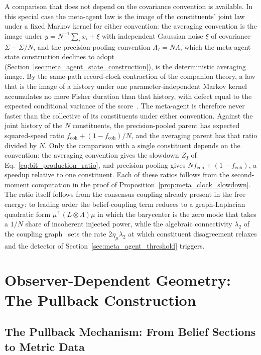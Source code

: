 \documentclass[11pt]{article}
\begin{document}
A comparison that does not depend on the covariance convention is available. In this special case the meta-agent law is the image of the constituents' joint law under a fixed Markov kernel for either convention: the averaging convention is the image under $y = N^{-1}\sum_i x_i + \xi$ with independent Gaussian noise $\xi$ of covariance $\Sigma - \Sigma/N$, and the precision-pooling convention $\Lambda_I = N\Lambda$, which the meta-agent state construction declines to adopt (Section~\ref{sec:meta_agent_state_construction}), is the deterministic averaging image. By the same-path record-clock contraction of the companion theory, a law that is the image of a history under one parameter-independent Markov kernel accumulates no more Fisher duration than that history, with defect equal to the expected conditional variance of the score~\cite[Ch.~7]{DennisGaugeVFE2026}. The meta-agent is therefore never faster than the collective of its constituents under either convention. Against the joint history of the $N$ constituents, the precision-pooled parent has expected squared-speed ratio $f_{\mathrm{coh}} + (1 - f_{\mathrm{coh}})/N$, and the averaging parent has that ratio divided by $N$. Only the comparison with a single constituent depends on the convention: the averaging convention gives the slowdown $Z_I$ of Eq.~\eqref{eq:bit_production_ratio}, and precision pooling gives $N f_{\mathrm{coh}} + (1 - f_{\mathrm{coh}})$, a speedup relative to one constituent. Each of these ratios follows from the second-moment computation in the proof of Proposition~\ref{prop:meta_clock_slowdown}. The ratio itself follows from the consensus coupling already present in the free energy: to leading order the belief-coupling term reduces to a graph-Laplacian quadratic form $\mu^\top (L \otimes \Lambda)\mu$ in which the barycenter is the zero mode that takes a $1/N$ share of incoherent injected power, while the algebraic connectivity $\lambda_2$ of the coupling graph~\cite{Fiedler1973} sets the rate $2\eta_\mu\lambda_2$ at which constituent disagreement relaxes and the detector of Section~\ref{sec:meta_agent_threshold} triggers.

\section{Observer-Dependent Geometry: The Pullback Construction}\label{sec:it_from_bit}

\subsection{The Pullback Mechanism: From Belief Sections to Metric Data}
\label{sec:pullback}
\end{document}
